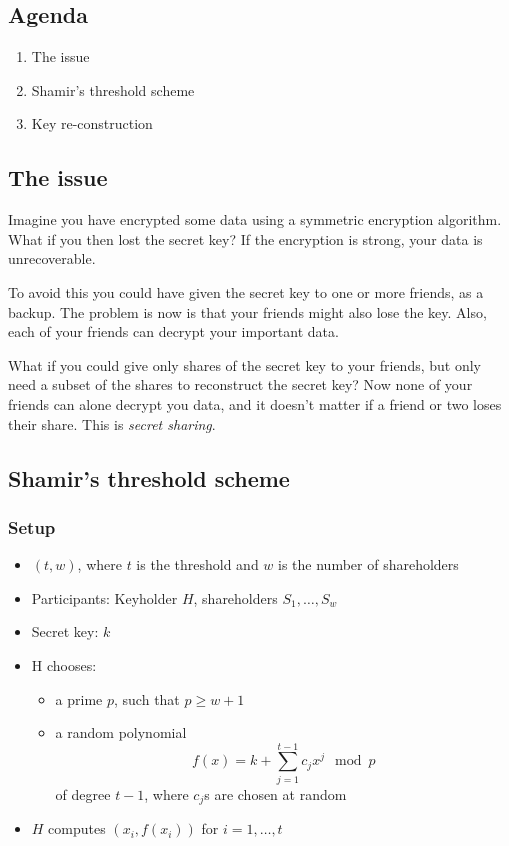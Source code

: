 

\subsection*{Agenda}
\begin{enumerate}
\item The issue
\item Shamir's threshold scheme
\item Key re-construction
\end{enumerate}

\subsection{The issue}
Imagine you have encrypted some data using a
symmetric encryption algorithm. What if you then lost the secret key?
If the encryption is strong, your data is unrecoverable.

To avoid this you could have given the secret key to one or more
friends, as a backup. The problem is now is that your friends might
also lose the key. Also, each of your friends can decrypt your
important data.

What if you could give  only shares of the secret key to your
friends, but only need a subset of the shares to reconstruct the
secret key? Now none of your friends can alone decrypt you data, and
it doesn't matter if a friend or two loses their share. This is
\emph{secret sharing}.

\subsection{Shamir's threshold scheme}
\subsubsection*{Setup}
\begin{itemize}
\item $(t, w)$, where $t$ is the threshold and $w$ is the number of shareholders
\item Participants: Keyholder $H$, shareholders $S_1, \ldots, S_w$
\item Secret key: $k$
\item H chooses:
  \begin{itemize}
  \item a prime $p$, such that $p \ge w + 1$
  \item a random polynomial
    \[
    f(x) = k + \sum\limits_{j=1}^{t-1} c_jx^j \mod p
    \]
    of degree $t-1$, where $c_j$s are chosen at random
  \end{itemize}
\item $H$ computes $(x_i, f(x_i))$ for $i  = 1, \ldots, t$
\end{itemize}

